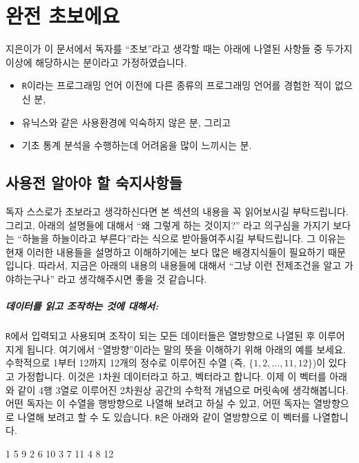 \documentclass[tutorial.tex]{subfiles}
\begin{document}
	
\chapter{완전 초보에요}

지은이가 이 문서에서 독자를 ``초보''라고 생각할 때는 아래에 나열된 사항들 중 두가지 이상에 해당하시는 분이라고 가정하였습니다. 

\begin{itemize}
\item \texttt{R}이라는 프로그래밍 언어 이전에 다른 종류의 프로그래밍 언어를 경험한 적이 없으신 분, 
\item 유닉스와 같은 사용환경에 익숙하지 않은 분, 그리고 
\item 기초 통계 분석을 수행하는데 어려움을 많이 느끼시는 분. 
\end{itemize}


\section{사용전 알아야 할 숙지사항들}

독자 스스로가 초보라고 생각하신다면 본 섹션의 내용을 꼭 읽어보시길 부탁드립니다.
그리고, 아래의 설명들에 대해서 ``왜 그렇게 하는 것이지?'' 라고 의구심을 가지기 보다는 ``하늘을 하늘이라고 부른다''라는 식으로 받아들여주시길 부탁드립니다.
그 이유는 현재 이러한 내용들을 설명하고 이해하기에는 보다 많은 배경지식들이 필요하기 때문입니다.
따라서, 지금은 아래의 내용의 내용들에 대해서 ``그냥 이런 전제조건을 알고 가야하는구나'' 라고 생각해주시면 좋을 것 같습니다.

\paragraph{데이터를 읽고 조작하는 것에 대해서:} 

\texttt{R}에서 입력되고 사용되며 조작이 되는 모든 데이터들은 열방향으로 나열된 후 이루어지게 됩니다.
여기에서 ``열방향''이라는 말의 뜻을 이해하기 위해 아래의 예를 보세요.
수학적으로 1부터 12까지 12개의 정수로 이루어진 수열 (즉, $\{ 1, 2, \ldots, 11, 12 \}$)이 있다고 가정합니다.
이것은 1차원 데이터라고 하고, 벡터라고 합니다.
이제 이 벡터를 아래와 같이 4행 3열로 이루어진 2차원상 공간의 수학적 개념으로 머릿속에 생각해봅니다. 
어떤 독자는 이 수열을 행방향으로 나열해 보려고 하실 수 있고, 어떤 독자는 열방향으로 나열해 보려고 할 수 도 있습니다. 
\texttt{R}은 아래와 같이 열방향으로 이 벡터를 나열합니다. 

\begin{Schunk}
\begin{Soutput}
1  5   9
2  6  10
3  7  11
4  8  12
\end{Soutput}
\end{Schunk}
\end{document}
